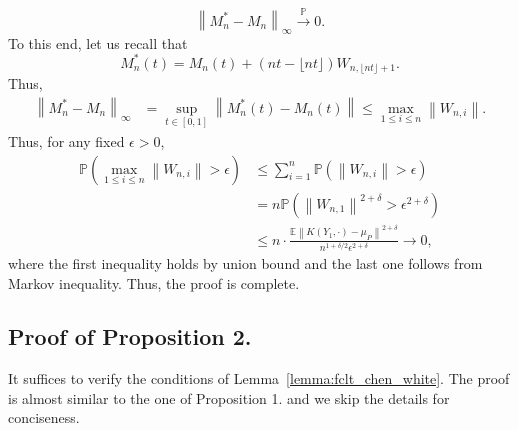 \documentclass[11pt]{article}
\newcommand{\bE}{\mathbb{E}}
\newcommand{\bP}{\mathbb{P}}
\theoremstyle{plain}
\theoremstyle{definition}
\theoremstyle{remark}
\begin{document}
\begin{appendix}
\[\left\|M_n^*-M_n\right\|_{\infty}\overset{\bP}{\to}0.\]
To this end, let us recall that
\[M_n^*(t)=M_n(t)+(nt-\lfloor nt\rfloor)W_{n,\lfloor nt\rfloor+1}.\]
Thus,
\begin{align*}
    \left\|M_n^*-M_n\right\|_{\infty}&=\sup_{t \in [0,1]}\left\|M^*_n(t)-M_n(t)\right\|\leq \max_{1\leq i \leq n}\left\|W_{n,i}\right\|.
\end{align*}
Thus, for any fixed $\epsilon>0$,
\begin{align*}
    \bP( \max_{1\leq i \leq n}\left\|W_{n,i}\right\|>\epsilon)&\leq \sum_{i=1}^n \bP(\left\|W_{n,i}\right\|>\epsilon)\\
    &=n\bP(\left\|W_{n,1}\right\|^{2+\delta}>\epsilon^{2+\delta})\\
    &\leq n\cdot \frac{\bE \left\|K(Y_1,\cdot)-\mu_P\right\|^{2+\delta}}{n^{1+\delta/2}\epsilon^{2+\delta}}\to 0,
\end{align*}
where the first inequality holds by union bound and the last one follows from Markov inequality. Thus, the proof is complete.

        \subsection{Proof of Proposition 2.}
        It suffices to verify the conditions of Lemma~\ref{lemma:fclt_chen_white}. The proof is almost similar to the one of Proposition 1. and we skip the details for conciseness.
        

\end{appendix}
\end{document}
